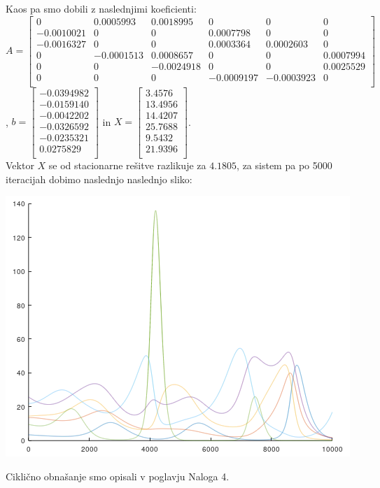 \documentclass[a4paper, 12pt]{article}
\begin{document}
Kaos pa smo dobili z naslednjimi koeficienti:\\
$ A =
\begin{bmatrix}
	0 & 0.0005993 & 0.0018995 & 0 & 0 & 0 \\
	-0.0010021 & 0 & 0 & 0.0007798 & 0 & 0 \\
	-0.0016327 & 0 & 0 & 0.0003364 & 0.0002603 & 0 \\
	0 & -0.0001513 & 0.0008657 & 0 & 0 & 0.0007994 \\
	0 & 0 & -0.0024918 & 0 & 0 & 0.0025529 \\
	0 & 0 & 0 & -0.0009197 & -0.0003923 & 0 \\
\end{bmatrix} $, 
$ b =
\begin{bmatrix}
	-0.0394982 \\
	-0.0159140 \\
	-0.0042202 \\
	-0.0326592 \\
	-0.0235321 \\
	0.0275829 \\
\end{bmatrix} $ in
$ X =
\begin{bmatrix}
	3.4576 \\
	13.4956 \\
	14.4207 \\
	25.7688 \\
	9.5432 \\
	21.9396 \\
\end{bmatrix} $. \\
Vektor $ X $ se od stacionarne rešitve razlikuje za $ 4.1805 $,
za sistem pa po 5000 iteracijah dobimo naslednjo naslednjo sliko:\\
\begin{center}
	\includegraphics{caos.png}
\end{center}
Ciklično obnašanje smo opisali v poglavju Naloga 4.
\end{document}
